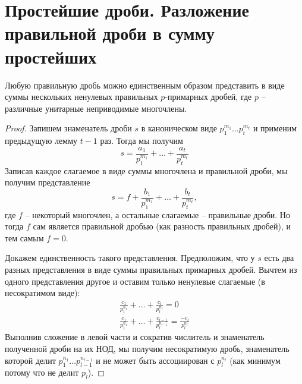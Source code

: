 \section{Простейшие дроби. Разложение правильной дроби в сумму простейших}
\begin{theorem-non}
    Любую правильную дробь можно единственным образом представить в виде суммы нескольких ненулевых правильных $p$-примарных дробей, 
    где $p$ -- различные унитарные неприводимые многочлены.
\end{theorem-non}

\begin{proof}
    Запишем знаменатель дроби $s$ в каноническом виде $p_1^{m_1} \dots p_t^{m_t}$ и применим предыдущую лемму $t - 1$ раз. 
    Тогда мы получим \[ s = \frac{a_1}{p_1^{m_1}} + \dots + \frac{a_t}{p_t^{m_t}} \]
    Записав каждое слагаемое в виде суммы многочлена и правильной дроби, мы получим представление
    \[ s = f + \frac{b_1}{p_1^{m_1}} + \dots + \frac{b_t}{p_t^{m_t}}, \]
    где $f$ -- некоторый многочлен, а остальные слагаемые -- правильные дроби. 
    Но тогда $f$ сам является правильной дробью (как разность правильных дробей), и тем самым $f = 0$.

    Докажем единственность такого представления. 
    Предположим, что у $s$ есть два разных представления в виде суммы правильных примарных дробей. 
    Вычтем из одного представления другое и оставим только ненулевые слагаемые (в несократимом виде):
    \begin{gather*}
        \frac{c_1}{p_1^{n_1}} + \dots + \frac{c_l}{p_l^{n_l}} = 0 \\
        \frac{c_1}{p_1^{n_1}} + \dots + \frac{c_{l - 1}}{p_l^{n_{l - 1}}} = \frac{-c_l}{p_l^{n_l}}
    \end{gather*}
    Выполнив сложение в левой части и сократив числитель и знаменатель полученной дроби на их НОД, мы получим несократимую дробь,
    знаменатель которой делит $p_1^{n_1} \dots p_{l - 1}^{n_{l - 1}}$ и не может быть ассоциирован с $p_l^{n_l}$ (как минимум потому что не делит $p_l$).
    
\end{proof}
